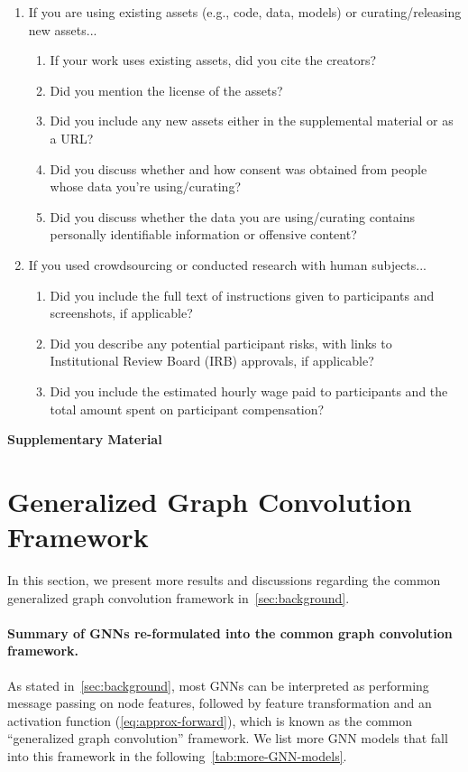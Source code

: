 \documentclass{article}
\newcommand{\cm}{\paragraph}
\begin{document}
\begin{enumerate}
\item If you are using existing assets (e.g., code, data, models) or curating/releasing new assets...
\begin{enumerate}
  \item If your work uses existing assets, did you cite the creators?
    \answerYes{}
  \item Did you mention the license of the assets?
    \answerYes{}
  \item Did you include any new assets either in the supplemental material or as a URL?
    \answerNo{}
  \item Did you discuss whether and how consent was obtained from people whose data you're using/curating?
    \answerNA{}
  \item Did you discuss whether the data you are using/curating contains personally identifiable information or offensive content?
    \answerNA{}
\end{enumerate}

\item If you used crowdsourcing or conducted research with human subjects...
\begin{enumerate}
  \item Did you include the full text of instructions given to participants and screenshots, if applicable?
    \answerNA{}
  \item Did you describe any potential participant risks, with links to Institutional Review Board (IRB) approvals, if applicable?
    \answerNA{}
  \item Did you include the estimated hourly wage paid to participants and the total amount spent on participant compensation?
    \answerNA{}
\end{enumerate}

\end{enumerate}




\clearpage
\newpage
{\centering \bf \LARGE
    Supplementary Material
}
\appendix



\section{Generalized Graph Convolution Framework}
\label{apd:generalized-conv}
In this section, we present more results and discussions regarding the common generalized graph convolution framework in~\cref{sec:background}.

\cm{Summary of GNNs re-formulated into the common graph convolution framework.}
As stated in~\cref{sec:background}, most GNNs can be interpreted as performing message passing on node features, followed by feature transformation and an activation function (\cref{eq:approx-forward}), which is known as the common ``generalized graph convolution'' framework. We list more GNN models that fall into this framework in the following~\cref{tab:more-GNN-models}.
\end{document}
